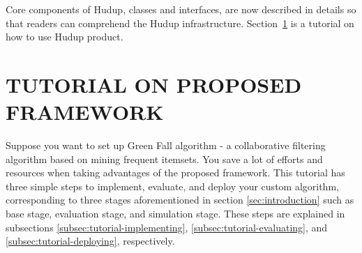 \documentclass[a4paper,twoside]{article}
\begin{document}
Core components of Hudup, classes and interfaces, are now described in details so that readers can comprehend the Hudup infrastructure. Section~\ref{sec:tutorial} is a tutorial on how to use Hudup product.

\section{\uppercase{Tutorial on Proposed Framework}}
\label{sec:tutorial}
Suppose you want to set up Green Fall algorithm - a collaborative filtering algorithm based on mining frequent itemsets. You save a lot of efforts and resources when taking advantages of the proposed framework. This tutorial has three simple steps to implement, evaluate, and deploy your custom algorithm, corresponding to three stages aforementioned in section \ref{sec:introduction} such as base stage, evaluation stage, and simulation stage. These steps are explained in subsections \ref{subsec:tutorial-implementing}, \ref{subsec:tutorial-evaluating}, and \ref{subsec:tutorial-deploying}, respectively. 
\end{document}
